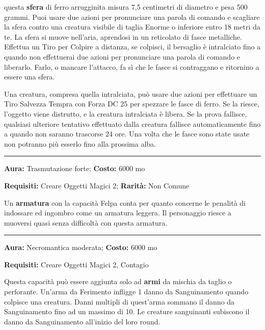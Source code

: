 \begin{multicols}{2}
questa \textbf{sfera} di ferro arrugginita misura 7,5 centimetri di diametro e pesa 500 grammi. Puoi usare due azioni per pronunciare una parola di comando e scagliare la sfera contro una creatura visibile di taglia Enorme o inferiore entro 18 metri da te. La sfera si muove nell'aria, aprendosi in un reticolato di fasce metalliche. Effettua un Tiro per Colpire a distanza, se colpisci, il bersaglio è intralciato fino a quando non effettuerai due azioni per pronunciare una parola di comando e liberarlo. Farlo, o mancare l'attacco, fa sì che le fasce si contraggano e ritornino a essere una sfera.

Una creatura, compresa quella intralciata, può usare due azioni per effettuare un Tiro Salvezza Tempra con Forza DC 25 per spezzare le fasce di ferro. Se la riesce, l'oggetto viene distrutto, e la creatura intralciata è libera. Se la prova fallisce, qualsiasi ulteriore tentativo effettuato dalla creatura fallisce automaticamente fino a quando non saranno trascorse 24 ore. Una volta che le fasce sono state usate non potranno più esserlo fino alla prossima alba.

\smallskip\noindent\rule{\linewidth}{2pt}  \hypertarget{Felpa}{}\medskip{}\noindent\label{Felpa}

\textbf{Aura:} Trasmutazione forte; \textbf{Costo:} 6000 mo

\textbf{Requisiti:} Creare Oggetti Magici 2; \textbf{Rarità:} Non Comune

Un \textbf{armatura} con la capacità Felpa conta per quanto concerne le penalità di indossare ed ingombro come un armatura leggera. Il personaggio riesce a muoversi quasi senza difficoltà con questa armatura.

\smallskip\noindent\rule{\linewidth}{2pt}  \hypertarget{Ferimento}{}\medskip{}\noindent\label{Ferimento}

\textbf{Aura:} Necromantica moderata; \textbf{Costo:} 6000 mo

\textbf{Requisiti:} Creare Oggetti Magici 2, Contagio

Questa capacità può essere aggiunta solo ad \textbf{armi} da mischia da taglio o perforante. Un'arma da Ferimento infligge 1 danno da Sanguinamento quando colpisce una creatura. Danni multipli di quest'arma sommano il danno da Sanguinamento fino ad un massimo di 10.
Le creature sanguinanti subiscono il danno da Sanguinamento all'inizio del loro round.


\end{multicols}
